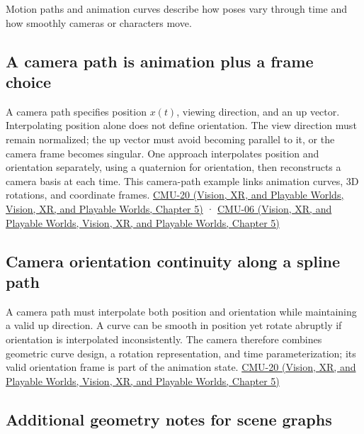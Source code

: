 Motion paths and animation curves describe how poses vary through time and how smoothly cameras or characters move.

\subsection{A camera path is animation plus a frame choice}\label{04-visual-computing-ii-ch029-a-camera-path-is-animation-plus-a-frame-choice}

A camera path specifies position \(x(t)\), viewing direction, and an up vector. Interpolating position alone does not define orientation. The view direction must remain normalized; the up vector must avoid becoming parallel to it, or the camera frame becomes singular. One approach interpolates position and orientation separately, using a quaternion for orientation, then reconstructs a camera basis at each time. This camera-path example links animation curves, 3D rotations, and coordinate frames. \href{../07-Vision-XR-and-Playable-Worlds/main.pdf\#nameddest=04-visual-computing-ii-ch036-cmu-20---introduction-to-animation}{CMU-20 (Vision, XR, and Playable Worlds, Vision, XR, and Playable Worlds, Chapter 5)} · \href{../07-Vision-XR-and-Playable-Worlds/main.pdf\#nameddest=04-visual-computing-ii-ch036-cmu-06---3d-rotations-and-complex-representations}{CMU-06 (Vision, XR, and Playable Worlds, Vision, XR, and Playable Worlds, Chapter 5)}

\subsection{Camera orientation continuity along a spline path}\label{04-visual-computing-ii-ch029-camera-orientation-continuity-along-a-spline-path}

A camera path must interpolate both position and orientation while maintaining a valid up direction. A curve can be smooth in position yet rotate abruptly if orientation is interpolated inconsistently. The camera therefore combines geometric curve design, a rotation representation, and time parameterization; its valid orientation frame is part of the animation state. \href{../07-Vision-XR-and-Playable-Worlds/main.pdf\#nameddest=04-visual-computing-ii-ch036-cmu-20---introduction-to-animation}{CMU-20 (Vision, XR, and Playable Worlds, Vision, XR, and Playable Worlds, Chapter 5)}

\subsection{Additional geometry notes for scene graphs}\label{04-visual-computing-ii-ch029-additional-geometry-notes-for-scene-graphs}

